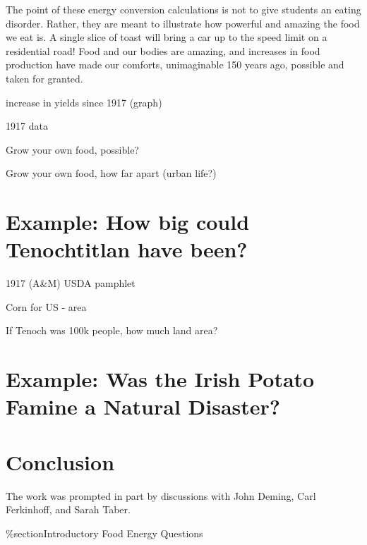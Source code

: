 \documentclass[12pt]{iopart}
\begin{document}
The point of these energy conversion calculations is not to give students an eating disorder.  Rather, they are meant to illustrate how powerful and amazing the food we eat is.  A single slice of toast will bring a car up to the speed limit on a residential road!  Food and our bodies are amazing, and increases in food production have made our comforts, unimaginable 150 years ago, possible and taken for granted.  

increase in yields since 1917 (graph)

1917 data

Grow your own food, possible?  

Grow your own food, how far apart (urban life?)


\section{Example: How big could Tenochtitlan have been?}

1917 (A\&M) USDA pamphlet

Corn for US - area

If Tenoch was 100k people, how much land area?

\section{Example: Was the Irish Potato Famine a Natural Disaster?}

\section{Conclusion}


\ack
The work was prompted in part by discussions with John Deming, Carl Ferkinhoff, and Sarah Taber.

\%section{Introductory Food Energy Questions}
\end{document}

